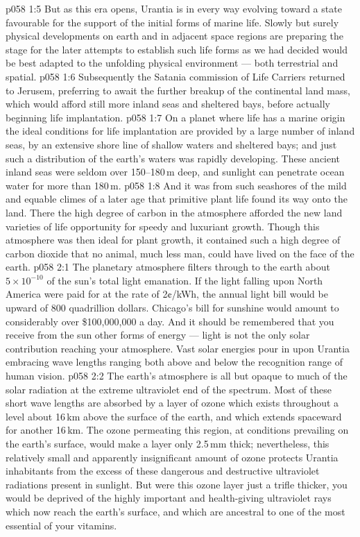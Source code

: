 \vs p058 1:5 But as this era opens, Urantia is in every way evolving toward a state favourable for the support of the initial forms of marine life. Slowly but surely physical developments on earth and in adjacent space regions are preparing the stage for the later attempts to establish such life forms as we had decided would be best adapted to the unfolding physical environment --- both terrestrial and spatial.
\vs p058 1:6 Subsequently the Satania commission of Life Carriers returned to Jerusem, preferring to await the further breakup of the continental land mass, which would afford still more inland seas and sheltered bays, before actually beginning life implantation.
\vs p058 1:7 \pc On a planet where life has a marine origin the ideal conditions for life implantation are provided by a large number of inland seas, by an extensive shore line of shallow waters and sheltered bays; and just such a distribution of the earth’s waters was rapidly developing. These ancient inland seas were seldom over 150--180\,m deep, and sunlight can penetrate ocean water for more than 180\,m.
\vs p058 1:8 And it was from such seashores of the mild and equable climes of a later age that primitive plant life found its way onto the land. There the high degree of carbon in the atmosphere afforded the new land varieties of life opportunity for speedy and luxuriant growth. Though this atmosphere was then ideal for plant growth, it contained such a high degree of carbon dioxide that no animal, much less man, could have lived on the face of the earth.
\vs p058 2:1 The planetary atmosphere filters through to the earth about $5 \times 10^{-10}$ of the sun’s total light emanation. If the light falling upon North America were paid for at the rate of 2¢/kWh, the annual light bill would be upward of 800 quadrillion dollars. Chicago’s bill for sunshine would amount to considerably over \$100,000,000 a day. And it should be remembered that you receive from the sun other forms of energy --- light is not the only solar contribution reaching your atmosphere. Vast solar energies pour in upon Urantia embracing wave lengths ranging both above and below the recognition range of human vision.
\vs p058 2:2 \pc The earth’s atmosphere is all but opaque to much of the solar radiation at the extreme ultraviolet end of the spectrum. Most of these short wave lengths are absorbed by a layer of ozone which exists throughout a level about 16\,km above the surface of the earth, and which extends spaceward for another 16\,km. The ozone permeating this region, at conditions prevailing on the earth’s surface, would make a layer only 2.5\,mm thick; nevertheless, this relatively small and apparently insignificant amount of ozone protects Urantia inhabitants from the excess of these dangerous and destructive ultraviolet radiations present in sunlight. But were this ozone layer just a trifle thicker, you would be deprived of the highly important and health\hyp{}giving ultraviolet rays which now reach the earth’s surface, and which are ancestral to one of the most essential of your vitamins.
